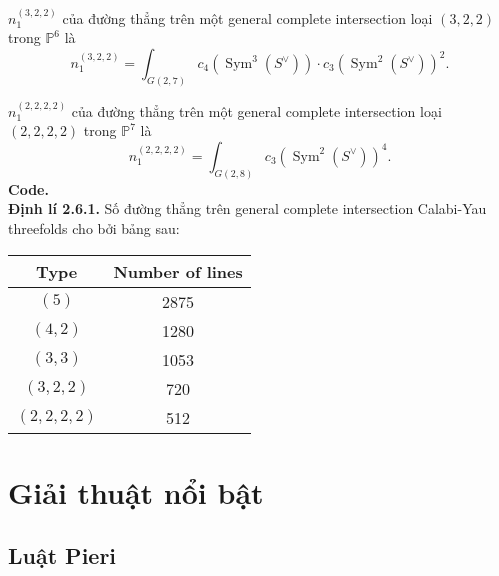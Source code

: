 \documentclass[11pt,a4paper]{book}
\begin{document}
$n_1^{(3,2,2)}$ của đường thẳng trên một general complete intersection loại $(3,2,2)$ trong $\mathbb{P}^6$ là
$$
n_1^{(3,2,2)}=\int_{G(2,7)} c_4\left(\operatorname{Sym}^3\left(S^{\vee}\right)\right) \cdot c_3\left(\operatorname{Sym}^2\left(S^{\vee}\right)\right)^2 .
$$

$n_1^{(2,2,2,2)}$ của đường thẳng trên một general complete intersection loại $(2,2,2,2)$ trong $\mathbb{P}^7$ là
$$
n_1^{(2,2,2,2)}=\int_{G(2,8)} c_3\left(\operatorname{Sym}^2\left(S^{\vee}\right)\right)^4 .
$$
\textbf{Code.}\\
\textbf{Định lí 2.6.1.} Số đường thẳng trên general complete intersection Calabi-Yau threefolds cho bởi bảng sau:
\begin{center}
	\begin{tabular}{|c|c|}
		\hline Type & Number of lines \\
		\hline$(5)$ & 2875 \\
		$(4,2)$ & 1280 \\
		$(3,3)$ & 1053 \\
		$(3,2,2)$ & 720 \\
		$(2,2,2,2)$ & 512 \\
		\hline
	\end{tabular}
\end{center}

\chapter{Giải thuật nổi bật}
\section{Luật Pieri}
\end{document}

